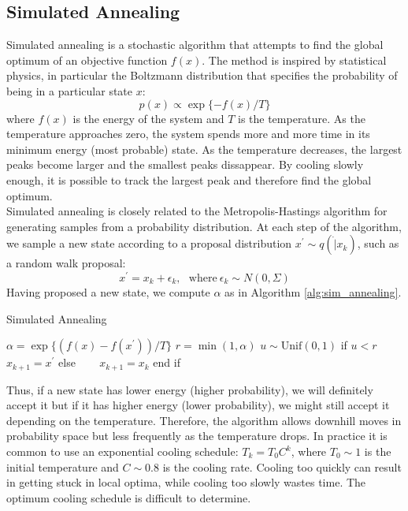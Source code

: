 \subsection{Simulated Annealing}

Simulated annealing is a stochastic algorithm that attempts to find the global optimum of an objective function $f(x)$. The method is inspired by statistical physics, in particular the Boltzmann distribution that specifies the probability of being in a particular state $x$:
\begin{equation}
    p(x) \propto \exp\{-f(x)/T\}
\end{equation}
where $f(x)$ is the energy of the system and $T$ is the temperature. As the temperature approaches zero, the system spends more and more time in its minimum energy (most probable) state. As the temperature decreases, the largest peaks become larger and the smallest peaks dissappear. By cooling slowly enough, it is possible to track the largest peak and therefore find the global optimum.\\

Simulated annealing is closely related to the Metropolis-Hastings algorithm for generating samples from a probability distribution. At each step of the algorithm, we sample a new state according to a proposal distribution $x^{\prime} \sim q(\dot|x_k)$, such as a random walk proposal:
\begin{equation}
    x^{\prime} = x_k + \epsilon_k, ~~~ \mathrm{where}~ \epsilon_k \sim N(0,\Sigma)
\end{equation}
Having proposed a new state, we compute $\alpha$ as in Algorithm \ref{alg:sim_annealing}.
\begin{algorithm}
\caption{Simulated Annealing}
\label{alg:sim_annealing}
\begin{algorithmic}[1]
\STATE $\alpha = \exp\{(f(x)-f(x^{\prime}))/T\}$
\STATE $r = \min(1,\alpha)$
\STATE $u \sim \mathrm{Unif}(0,1)$
\STATE if $u < r$ 
\STATE ~~~ $x_{k+1} = x^{\prime}$
\STATE else
\STATE ~~~ $x_{k+1} = x_k$
\STATE end if  
\end{algorithmic}
\end{algorithm}
Thus, if a new state has lower energy (higher probability), we will definitely accept it but if it has higher energy (lower probability), we might still accept it depending on the temperature. Therefore, the algorithm allows downhill moves in probability space but less frequently as the temperature drops. In practice it is common to use an exponential cooling schedule: $T_k = T_0 C^{k}$, where $T_0 \sim 1$ is the initial temperature and $C \sim 0.8$ is the cooling rate. Cooling too quickly can result in getting stuck in local optima, while cooling too slowly wastes time. The optimum cooling schedule is difficult to determine.    

